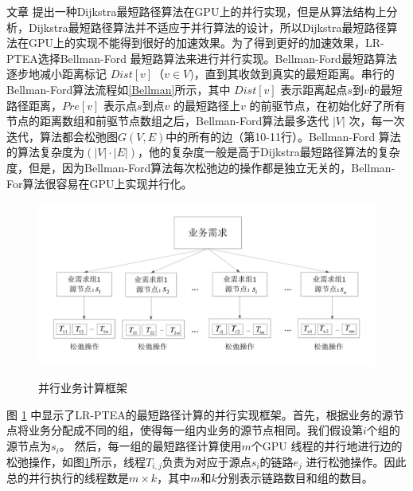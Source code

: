 文章 提出一种Dijkstra最短路径算法在GPU上的并行实现，但是从算法结构上分析，Dijkstra最短路径算法并不适应于并行算法的设计，所以Dijkstra最短路径算法在GPU上的实现不能得到很好的加速效果。为了得到更好的加速效果，LR-PTEA选择Bellman-Ford 最短路算法来进行并行实现。Bellman-Ford最短路算法逐步地减小距离标记 $Dist[v]$（$v\in V$)，直到其收敛到真实的最短距离。串行的Bellman-Ford算法流程如\ref{Bellman}所示，其中 $Dist[v]$ 表示距离起点$s$到$v$的最短路径距离，$Pre[v]$ 表示点$s$到点$v$ 的最短路径上$v$ 的前驱节点，在初始化好了所有节点的距离数组和前驱节点数组之后，Bellman-Ford算法最多迭代 $|V|$ 次，每一次迭代，算法都会松弛图$G(V, E)$中的所有的边（第10-11行）。Bellman-Ford 算法的算法复杂度为$(|V|\cdot |E|)$，他的复杂度一般是高于Dijkstra最短路径算法的复杂度，但是，因为Bellman-Ford算法每次松弛边的操作都是独立无关的，Bellman-For算法很容易在GPU上实现并行化。
\begin{figure}
\setlength{\abovecaptionskip}{-0.5cm}
\begin{center}
{\includegraphics[width=1 \textwidth]{figures/paframework.pdf}}
\end{center}
\caption{{\footnotesize{并行业务计算框架}}}
\label{ParFramework}
\end{figure}

图 \ref{ParFramework} 中显示了LR-PTEA的最短路径计算的并行实现框架。首先，根据业务的源节点将业务分配成不同的组，使得每一组内业务的源节点相同。我们假设第$i$个组的源节点为$s_i$。 然后，每一组的最短路径计算使用$m$个GPU 线程的并行地进行边的松弛操作，如图\ref{ParFramework}所示，线程$T_{i,j}$负责为对应于源点$s_i$的链路$e_{j}$ 进行松弛操作。因此总的并行执行的线程数是$m \times k$，其中$m$和$k$分别表示链路数目和组的数目。

